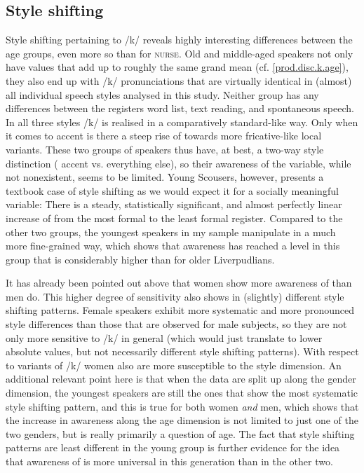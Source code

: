\subsection{Style shifting}
\label{prod.disc.k.style}

Style shifting pertaining to /k/  reveals highly interesting differences between the age groups, even more so than for \textsc{nurse}.
Old and middle-aged speakers not only have  values that add up to roughly the same grand mean (cf. \ref{prod.disc.k.age}), they also end up with /k/ pronunciations that are virtually identical in (almost) all individual speech styles analysed in this study.
Neither group has any differences between the registers word list, text reading, and spontaneous speech.
In all three styles /k/ is realised in a comparatively standard-like way.
Only when it comes to accent  is there a steep rise of  towards more fricative-like local variants.
These two groups of speakers thus have, at best, a two-way style distinction ( accent vs. everything else), so their awareness of the variable, while not nonexistent, seems to be limited.
Young Scousers, however, presents a textbook case of style shifting as we would expect it for a socially meaningful variable: There is a steady, statistically significant, and almost perfectly linear increase of  from the most formal to the least formal register.
Compared to the other two groups, the youngest speakers in my sample manipulate  in a much more fine-grained way, which shows that awareness has reached a level in this group that is considerably higher than for older Liverpudlians.

It has already been pointed out above that women show more awareness of  than men do.
This higher degree of sensitivity also shows in (slightly) different style shifting patterns.
Female speakers exhibit more systematic and more pronounced style differences than those that are observed for male subjects, so they are not only more sensitive to /k/  in general (which would just translate to lower absolute  values, but not necessarily different style shifting patterns).
With respect to  variants of /k/ women also are more susceptible to the style dimension.
An additional relevant point here is that when the data are split up along the gender dimension, the youngest speakers are still the ones that show the most systematic style shifting pattern, and this is true for both women \emph{and} men, which shows that the increase in awareness along the age dimension is not limited to just one of the two genders, but is really primarily a question of age.
The fact that style shifting patterns are least different in the young group is further evidence for the idea that awareness of  is more universal in this generation than in the other two.


